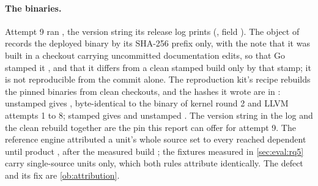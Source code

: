\paragraph{The binaries.}
Attempt 9 ran , the version string its
release log prints (, field ). The
 object of  records the deployed binary
by its SHA-256 prefix  only, with the note that it was
built in a checkout carrying uncommitted documentation edits, so that Go
stamped it , and that it differs from a clean stamped
build only by that stamp; it is not reproducible from the commit alone. The
reproduction kit's recipe
 rebuilds
the pinned binaries from clean checkouts, and the hashes it wrote are in
:  unstamped gives
,
byte-identical to the binary of kernel round 2 and LLVM attempts 1 to 8;
 stamped gives
and unstamped
.
The version string in the log and the clean rebuild together are the pin this
report can offer for attempt 9. The reference engine attributed a unit's whole source set to every reached dependent until product  , after the measured build ; the fixtures measured in \cref{sec:eval:rq5} carry single-source units only, which both rules attribute identically. The defect and its fix are \cref{ob:attribution}.

